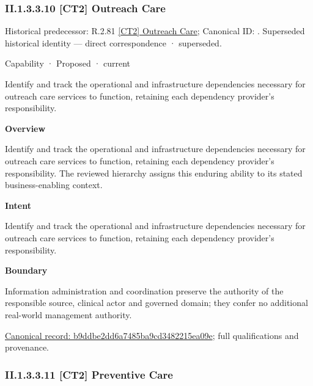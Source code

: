 \subsubsection*{II.1.3.3.10 [CT2] Outreach Care}
\label{navigation:II.1.3.3.10}

{\small Historical predecessor: R.2.81 \hyperref[element:75f8b32a3d5048ccbdfb30d61ae73dad]{[CT2] Outreach Care}; Canonical ID: \texttt{}. Superseded historical identity — direct correspondence · superseded.}\par
\label{element:b9ddbe2dd6a7485ba9cd3482215ea09e}
{\small Capability · Proposed · current}\par

Identify and track the operational and infrastructure dependencies necessary for outreach care services to function, retaining each dependency provider's responsibility.



\textbf{Overview}



Identify and track the operational and infrastructure dependencies necessary for outreach care services to function, retaining each dependency provider's responsibility. The reviewed hierarchy assigns this enduring ability to its stated business-enabling context.



\textbf{Intent}



Identify and track the operational and infrastructure dependencies necessary for outreach care services to function, retaining each dependency provider's responsibility.



\textbf{Boundary}



Information administration and coordination preserve the authority of the responsible source, clinical actor and governed domain; they confer no additional real-world management authority.


{\footnotesize \href{../../../../continuum/strategy/capability/b9ddbe2dd6a7485ba9cd3482215ea09e.md}{Canonical record: b9ddbe2dd6a7485ba9cd3482215ea09e}; full qualifications and provenance.}\par
\subsubsection*{II.1.3.3.11 [CT2] Preventive Care}
\label{navigation:II.1.3.3.11}

